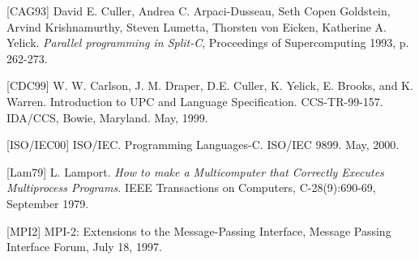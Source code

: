 \pagebreak
{}

[CAG93]  David E. Culler, Andrea C. Arpaci-Dusseau, Seth Copen Goldstein,
  Arvind Krishnamurthy, Steven Lumetta, Thorsten von Eicken, Katherine A. Yelick.
  {\em Parallel programming in Split-C},  
  Proceedings of Supercomputing 1993, p. 262-273.

[CDC99] W. W. Carlson, J. M. Draper, D.E. Culler, K. Yelick,
   E. Brooks, and K.  Warren.  Introduction to UPC and Language
   Specification.  CCS-TR-99-157. IDA/CCS, Bowie, Maryland.  May,
   1999.

[ISO/IEC00] ISO/IEC.  Programming Languages-C. ISO/IEC 9899. May, 2000.

[Lam79] L. Lamport. {\em How to make a Multicomputer that Correctly Executes
  Multiprocess Programs.} IEEE Transactions on Computers, C-28(9):690-69,
  September 1979.
  
[MPI2] MPI-2: Extensions to the Message-Passing Interface,
  Message Passing Interface Forum, July 18, 1997.
